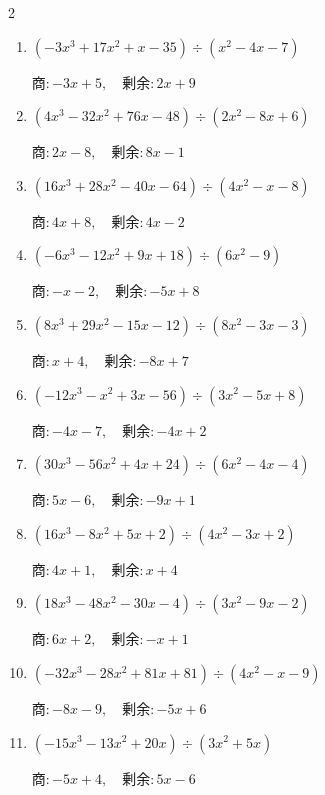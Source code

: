 \begin{multicols}{2}
\begin{enumerate}
  \itemsep=95pt
  \item $(-3x^{3}+17x^{2}+x-35) \div (x^{2}-4x-7)$

        $商 : -3x+5, \quad 剰余 : 2x+9$

  \item $(4x^{3}-32x^{2}+76x-48) \div (2x^{2}-8x+6)$

        $商 : 2x-8, \quad 剰余 : 8x-1$

  \item $(16x^{3}+28x^{2}-40x-64) \div (4x^{2}-x-8)$

        $商 : 4x+8, \quad 剰余 : 4x-2$

  \item $(-6x^{3}-12x^{2}+9x+18) \div (6x^{2}-9)$

        $商 : -x-2, \quad 剰余 : -5x+8$

  \item $(8x^{3}+29x^{2}-15x-12) \div (8x^{2}-3x-3)$

        $商 : x+4, \quad 剰余 : -8x+7$

\columnbreak %

  \item $(-12x^{3}-x^{2}+3x-56) \div (3x^{2}-5x+8)$

        $商 : -4x-7, \quad 剰余 : -4x+2$

  \item $(30x^{3}-56x^{2}+4x+24) \div (6x^{2}-4x-4)$

        $商 : 5x-6, \quad 剰余 : -9x+1$

  \item $(16x^{3}-8x^{2}+5x+2) \div (4x^{2}-3x+2)$

        $商 : 4x+1, \quad 剰余 : x+4$

  \item $(18x^{3}-48x^{2}-30x-4) \div (3x^{2}-9x-2)$

        $商 : 6x+2, \quad 剰余 : -x+1$

  \item $(-32x^{3}-28x^{2}+81x+81) \div (4x^{2}-x-9)$

        $商 : -8x-9, \quad 剰余 : -5x+6$

\columnbreak %

\resetques

  \item $(-15x^{3}-13x^{2}+20x) \div (3x^{2}+5x)$

        $商 : -5x+4, \quad 剰余 : 5x-6$


\end{enumerate}
\end{multicols}
